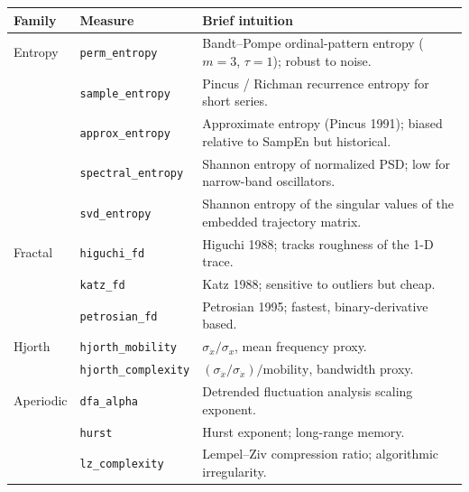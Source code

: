 \documentclass[11pt,a4paper]{article}
\newcommand{\code}[1]{\texttt{\small #1}}
\begin{document}
\begin{table}[ht]
\centering
\renewcommand{\arraystretch}{1.18}
\setlength{\tabcolsep}{6pt}
\begin{tabularx}{\linewidth}{l l X}
\toprule
\textbf{Family} & \textbf{Measure} & \textbf{Brief intuition} \\
\midrule
Entropy & \code{perm\_entropy}     & Bandt--Pompe ordinal-pattern entropy
                                     ($m=3$, $\tau=1$); robust to noise. \citep{bandt2002} \\
        & \code{sample\_entropy}   & Pincus / Richman recurrence entropy
                                     for short series. \citep{richman2000} \\
        & \code{approx\_entropy}   & Approximate entropy (Pincus 1991);
                                     biased relative to SampEn but historical. \\
        & \code{spectral\_entropy} & Shannon entropy of normalized PSD;
                                     low for narrow-band oscillators. \\
        & \code{svd\_entropy}      & Shannon entropy of the singular values
                                     of the embedded trajectory matrix. \\
\midrule
Fractal & \code{higuchi\_fd}       & Higuchi 1988; tracks roughness of
                                     the 1-D trace. \\
        & \code{katz\_fd}          & Katz 1988; sensitive to outliers but cheap. \\
        & \code{petrosian\_fd}     & Petrosian 1995; fastest, binary-derivative
                                     based. \\
\midrule
Hjorth  & \code{hjorth\_mobility}  & $\sigma_{\dot x}/\sigma_x$, mean
                                     frequency proxy. \\
        & \code{hjorth\_complexity}& $(\sigma_{\ddot x}/\sigma_{\dot x})/\text{mobility}$,
                                     bandwidth proxy. \citep{hjorth1970} \\
\midrule
Aperiodic
        & \code{dfa\_alpha}        & Detrended fluctuation analysis
                                     scaling exponent. \citep{peng1995} \\
        & \code{hurst}             & Hurst exponent; long-range memory. \\
        & \code{lz\_complexity}    & Lempel--Ziv compression ratio; algorithmic
                                     irregularity. \citep{lempel1976} \\

\end{tabularx}
\end{table}
\end{document}
